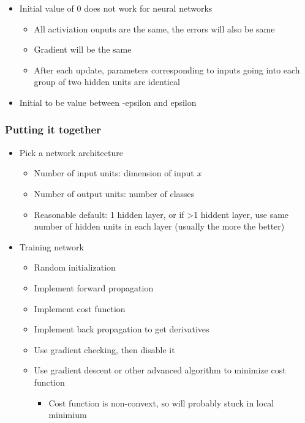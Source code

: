 \documentclass[]{article}
\providecommand{\tightlist}{%
  \setlength{\itemsep}{0pt}\setlength{\parskip}{0pt}}
\begin{document}
\begin{itemize}
\tightlist
\item
  Initial value of 0 does not work for neural networks

  \begin{itemize}
  \tightlist
  \item
    All activiation ouputs are the same, the errors will also be same
  \item
    Gradient will be the same
  \item
    After each update, parameters corresponding to inputs going into
    each group of two hidden units are identical
  \end{itemize}
\item
  Initial to be value between -epsilon and epsilon
\end{itemize}

\hypertarget{putting-it-together}{%
\subsubsection{Putting it together}\label{putting-it-together}}

\begin{itemize}
\tightlist
\item
  Pick a network architecture

  \begin{itemize}
  \tightlist
  \item
    Number of input units: dimension of input \emph{x}
  \item
    Number of output units: number of classes
  \item
    Reasonable default: 1 hidden layer, or if \textgreater{}1 hiddent
    layer, use same number of hidden units in each layer (usually the
    more the better)
  \end{itemize}
\item
  Training network

  \begin{itemize}
  \tightlist
  \item
    Random initialization
  \item
    Implement forward propagation
  \item
    Implement cost function
  \item
    Implement back propagation to get derivatives
  \item
    Use gradient checking, then disable it
  \item
    Use gradient descent or other advanced algorithm to minimize cost
    function

    \begin{itemize}
    \tightlist
    \item
      Cost function is non-convext, so will probably stuck in local
      minimium
    \end{itemize}
  \end{itemize}
\end{itemize}
\end{document}
